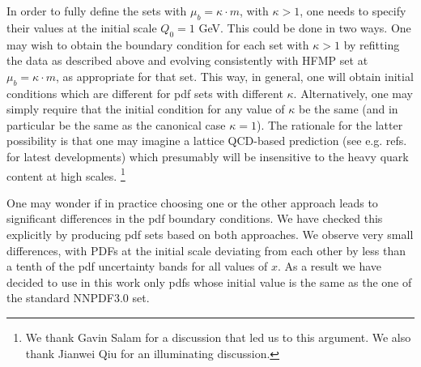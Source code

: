 \documentclass[letter,11pt]{article}
\def\mub{\mu_b}
\def\k{\kappa}
\begin{document}
In order to fully define the sets with $\mub=\k \cdot m$, with $\k>1$, one needs to specify their values at the initial scale $Q_0=1$ GeV. This could be done in two ways. One may wish to obtain the boundary condition for each set with $\k>1$ by refitting the data as described above and evolving consistently with HFMP set at $\mub=\k\cdot m$, as appropriate for that set. This way, in general, one will obtain initial conditions which are different for pdf sets with different $\k$. Alternatively, one may simply require that the initial condition for any value of $\k$ be the same (and in particular be the same as the canonical case $\k=1$). The rationale for the latter possibility is that one may imagine a lattice QCD-based prediction (see e.g. refs.~\cite{Alexandrou:2017huk,Nocera:2017war,Orginos:2017kos} for latest developments) which presumably will be insensitive to the heavy quark content at high scales.
%
\footnote{We thank Gavin Salam for a discussion that led us to this argument. We also thank Jianwei Qiu for an illuminating discussion.}
%


One may wonder if in practice choosing one or the other approach leads to significant differences in the pdf boundary conditions. We have checked this explicitly by producing pdf sets based on both approaches. We observe very small differences, with PDFs at the initial scale deviating from each other by less than a tenth of the pdf uncertainty bands for all values of $x$. As a result we have decided to use in this work only pdfs whose initial value is the same as the one of the standard NNPDF3.0 set.
\end{document}

